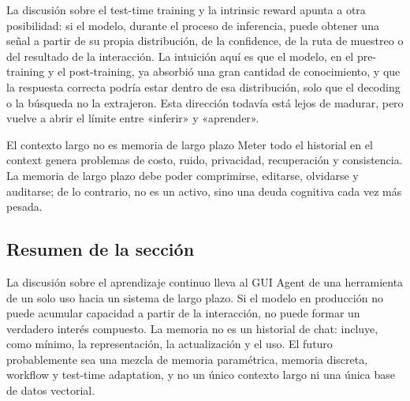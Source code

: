 La discusión sobre el test-time training y la intrinsic reward apunta a otra posibilidad: si el modelo, durante el proceso de inferencia, puede obtener una señal a partir de su propia distribución, de la confidence, de la ruta de muestreo o del resultado de la interacción. La intuición aquí es que el modelo, en el pre-training y el post-training, ya absorbió una gran cantidad de conocimiento, y que la respuesta correcta podría estar dentro de esa distribución, solo que el decoding o la búsqueda no la extrajeron. Esta dirección todavía está lejos de madurar, pero vuelve a abrir el límite entre «inferir» y «aprender».

\begin{warningbox}{El contexto largo no es memoria de largo plazo}
Meter todo el historial en el context genera problemas de costo, ruido, privacidad, recuperación y consistencia. La memoria de largo plazo debe poder comprimirse, editarse, olvidarse y auditarse; de lo contrario, no es un activo, sino una deuda cognitiva cada vez más pesada.
\end{warningbox}

\subsection{Resumen de la sección}

La discusión sobre el aprendizaje continuo lleva al GUI Agent de una herramienta de un solo uso hacia un sistema de largo plazo. Si el modelo en producción no puede acumular capacidad a partir de la interacción, no puede formar un verdadero interés compuesto. La memoria no es un historial de chat: incluye, como mínimo, la representación, la actualización y el uso. El futuro probablemente sea una mezcla de memoria paramétrica, memoria discreta, workflow y test-time adaptation, y no un único contexto largo ni una única base de datos vectorial.
